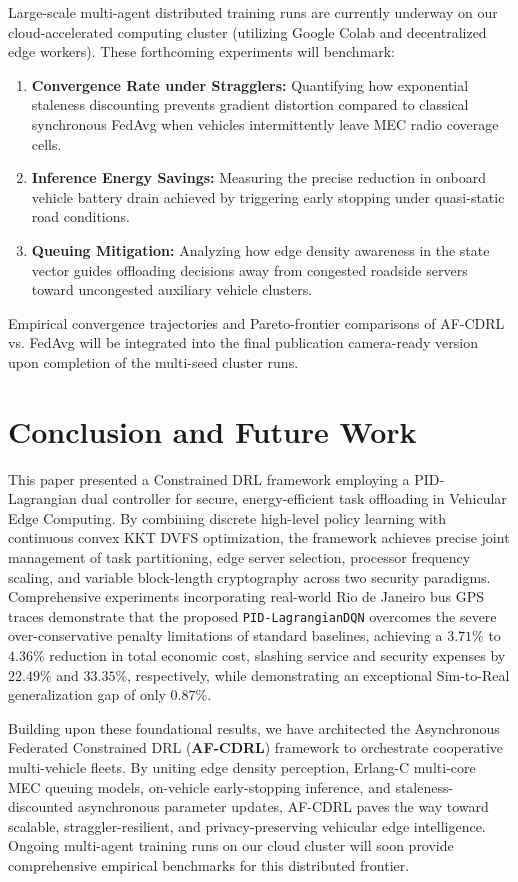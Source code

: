 \documentclass[12pt,a4paper]{article}
\begin{document}
Large-scale multi-agent distributed training runs are currently underway on our cloud-accelerated computing cluster (utilizing Google Colab and decentralized edge workers). These forthcoming experiments will benchmark:
\begin{enumerate}
    \item \textbf{Convergence Rate under Stragglers:} Quantifying how exponential staleness discounting prevents gradient distortion compared to classical synchronous FedAvg when vehicles intermittently leave MEC radio coverage cells.
    \item \textbf{Inference Energy Savings:} Measuring the precise reduction in onboard vehicle battery drain achieved by triggering early stopping under quasi-static road conditions.
    \item \textbf{Queuing Mitigation:} Analyzing how edge density awareness in the state vector guides offloading decisions away from congested roadside servers toward uncongested auxiliary vehicle clusters.
\end{enumerate}
Empirical convergence trajectories and Pareto-frontier comparisons of AF-CDRL vs. FedAvg will be integrated into the final publication camera-ready version upon completion of the multi-seed cluster runs.

\section{Conclusion and Future Work}
This paper presented a Constrained DRL framework employing a PID-Lagrangian dual controller for secure, energy-efficient task offloading in Vehicular Edge Computing. By combining discrete high-level policy learning with continuous convex KKT DVFS optimization, the framework achieves precise joint management of task partitioning, edge server selection, processor frequency scaling, and variable block-length cryptography across two security paradigms. Comprehensive experiments incorporating real-world Rio de Janeiro bus GPS traces demonstrate that the proposed \texttt{PID-LagrangianDQN} overcomes the severe over-conservative penalty limitations of standard baselines, achieving a $3.71\%$ to $4.36\%$ reduction in total economic cost, slashing service and security expenses by $22.49\%$ and $33.35\%$, respectively, while demonstrating an exceptional Sim-to-Real generalization gap of only $0.87\%$.

Building upon these foundational results, we have architected the Asynchronous Federated Constrained DRL (\textbf{AF-CDRL}) framework to orchestrate cooperative multi-vehicle fleets. By uniting edge density perception, Erlang-C multi-core MEC queuing models, on-vehicle early-stopping inference, and staleness-discounted asynchronous parameter updates, AF-CDRL paves the way toward scalable, straggler-resilient, and privacy-preserving vehicular edge intelligence. Ongoing multi-agent training runs on our cloud cluster will soon provide comprehensive empirical benchmarks for this distributed frontier.
\end{document}
